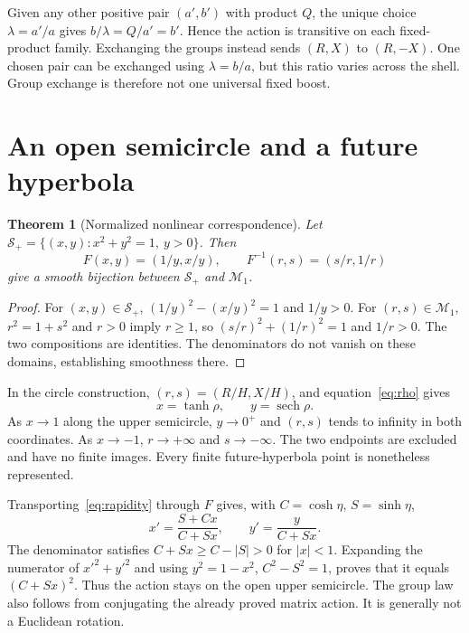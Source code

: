 \documentclass[11pt,a4paper]{article}
\newtheorem{theorem}{Theorem}[section]
\newcommand{\sech}{\operatorname{sech}}
\begin{document}
Given any other positive pair $(a',b')$ with product $Q$, the unique choice $\lambda=a'/a$ gives $b/\lambda=Q/a'=b'$. Hence the action is transitive on each fixed-product family. Exchanging the groups instead sends $(R,X)$ to $(R,-X)$. One chosen pair can be exchanged using $\lambda=b/a$, but this ratio varies across the shell. Group exchange is therefore not one universal fixed boost.

\section{An open semicircle and a future hyperbola}
\label{sec:semicircle}
\begin{theorem}[Normalized nonlinear correspondence]
Let $\mathcal S_+=\{(x,y):x^2+y^2=1,\ y>0\}$. Then
\begin{equation}
 F(x,y)=(1/y,x/y),\qquad
 F^{-1}(r,s)=(s/r,1/r)
 \label{eq:F}
\end{equation}
give a smooth bijection between $\mathcal S_+$ and $\mathcal M_1$.
\end{theorem}
\begin{proof}
For $(x,y)\in\mathcal S_+$, $(1/y)^2-(x/y)^2=1$ and $1/y>0$. For $(r,s)\in\mathcal M_1$, $r^2=1+s^2$ and $r>0$ imply $r\ge1$, so $(s/r)^2+(1/r)^2=1$ and $1/r>0$. The two compositions are identities. The denominators do not vanish on these domains, establishing smoothness there.
\end{proof}
In the circle construction, $(r,s)=(R/H,X/H)$, and equation~\eqref{eq:rho} gives
\begin{equation}
 x=\tanh\rho,\qquad y=\sech\rho.
 \label{eq:sech}
\end{equation}
As $x\to1$ along the upper semicircle, $y\to0^+$ and $(r,s)$ tends to infinity in both coordinates. As $x\to-1$, $r\to+\infty$ and $s\to-\infty$. The two endpoints are excluded and have no finite images. Every finite future-hyperbola point is nonetheless represented.

Transporting~\eqref{eq:rapidity} through $F$ gives, with $C=\cosh\eta$, $S=\sinh\eta$,
\begin{equation}
 x'=\frac{S+Cx}{C+Sx},\qquad y'=\frac{y}{C+Sx}.
 \label{eq:fractional}
\end{equation}
The denominator satisfies $C+Sx\ge C-|S|>0$ for $|x|<1$. Expanding the numerator of $x'^2+y'^2$ and using $y^2=1-x^2$, $C^2-S^2=1$, proves that it equals $(C+Sx)^2$. Thus the action stays on the open upper semicircle. The group law also follows from conjugating the already proved matrix action. It is generally not a Euclidean rotation.
\end{document}
